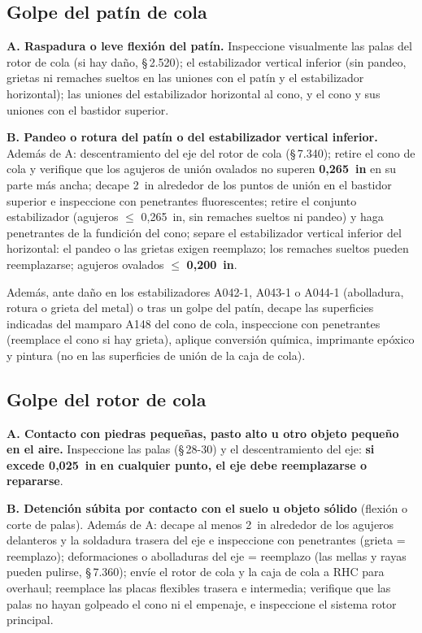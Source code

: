 \subsection{Golpe del patín de cola}

\textbf{A. Raspadura o leve flexión del patín.} Inspeccione visualmente las palas del rotor de cola (si hay daño, \S\,2.520); el estabilizador vertical inferior (sin pandeo, grietas ni remaches sueltos en las uniones con el patín y el estabilizador horizontal); las uniones del estabilizador horizontal al cono, y el cono y sus uniones con el bastidor superior.

\textbf{B. Pandeo o rotura del patín o del estabilizador vertical inferior.} Además de A: descentramiento del eje del rotor de cola (\S\,7.340); retire el cono de cola y verifique que los agujeros de unión ovalados no superen \textbf{0,265~in} en su parte más ancha; decape 2~in alrededor de los puntos de unión en el bastidor superior e inspeccione con penetrantes fluorescentes; retire el conjunto estabilizador (agujeros $\le$ 0,265~in, sin remaches sueltos ni pandeo) y haga penetrantes de la fundición del cono; separe el estabilizador vertical inferior del horizontal: el pandeo o las grietas exigen reemplazo; los remaches sueltos pueden reemplazarse; agujeros ovalados $\le$ \textbf{0,200~in}.

Además, ante daño en los estabilizadores A042-1, A043-1 o A044-1 (abolladura, rotura o grieta del metal) o tras un golpe del patín, decape las superficies indicadas del mamparo A148 del cono de cola, inspeccione con penetrantes (reemplace el cono si hay grieta), aplique conversión química, imprimante epóxico y pintura (no en las superficies de unión de la caja de cola).

\subsection{Golpe del rotor de cola}

\textbf{A. Contacto con piedras pequeñas, pasto alto u otro objeto pequeño en el aire.} Inspeccione las palas (\S\,28-30) y el descentramiento del eje: \textbf{si excede 0,025~in en cualquier punto, el eje debe reemplazarse o repararse}.

\textbf{B. Detención súbita por contacto con el suelo u objeto sólido} (flexión o corte de palas). Además de A: decape al menos 2~in alrededor de los agujeros delanteros y la soldadura trasera del eje e inspeccione con penetrantes (grieta = reemplazo); deformaciones o abolladuras del eje = reemplazo (las mellas y rayas pueden pulirse, \S\,7.360); envíe el rotor de cola y la caja de cola a RHC para overhaul; reemplace las placas flexibles trasera e intermedia; verifique que las palas no hayan golpeado el cono ni el empenaje, e inspeccione el sistema rotor principal.

